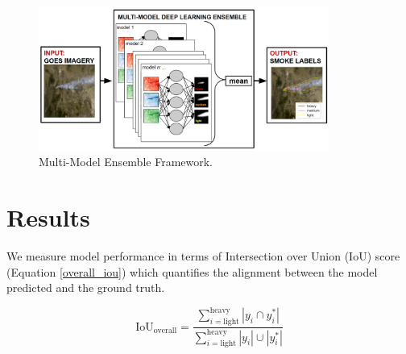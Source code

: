 \documentclass{article}
\begin{document}
\begin{figure}[h]
    \centering
    \includegraphics[width=0.85\textwidth]{ensemble_framework.png}
    \caption{Multi-Model Ensemble Framework.}
    \label{fig:ensemble_framework}
\end{figure}


\section{Results}
We measure model performance in terms of Intersection over Union (IoU) score (Equation \ref{overall_iou}) which quantifies the alignment between the model predicted and the ground truth. 

\begin{equation} \label{overall_iou}
    \text{IoU}_{\text{overall}} = \frac{\sum\limits_{i=\text{light}}^{\text{heavy}}|y_{i}\cap y^*_{i}|}{\sum\limits_{i=\text{light}}^{\text{heavy}}|y_{i}|\cup|y^*_{i}|}
\end{equation}
\end{document}
